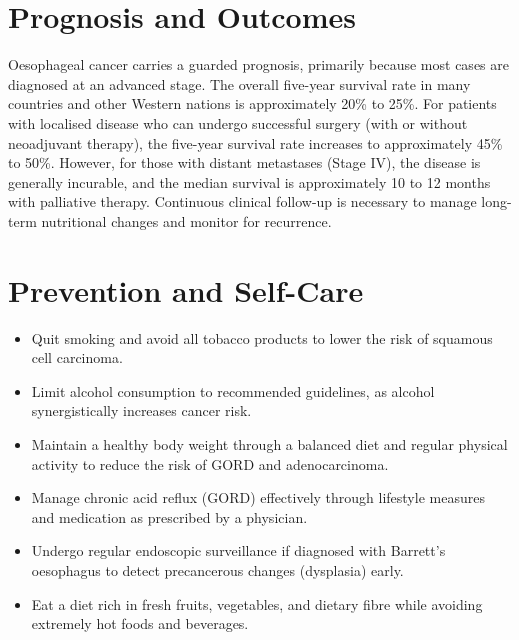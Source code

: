 \section*{Prognosis and Outcomes}
Oesophageal cancer carries a guarded prognosis, primarily because most cases are diagnosed at an advanced stage. The overall five-year survival rate in many countries and other Western nations is approximately 20\% to 25\%. For patients with localised disease who can undergo successful surgery (with or without neoadjuvant therapy), the five-year survival rate increases to approximately 45\% to 50\%. However, for those with distant metastases (Stage IV), the disease is generally incurable, and the median survival is approximately 10 to 12 months with palliative therapy. Continuous clinical follow-up is necessary to manage long-term nutritional changes and monitor for recurrence.

\section*{Prevention and Self-Care}
\begin{itemize}
    \item Quit smoking and avoid all tobacco products to lower the risk of squamous cell carcinoma.
    \item Limit alcohol consumption to recommended guidelines, as alcohol synergistically increases cancer risk.
    \item Maintain a healthy body weight through a balanced diet and regular physical activity to reduce the risk of GORD and adenocarcinoma.
    \item Manage chronic acid reflux (GORD) effectively through lifestyle measures and medication as prescribed by a physician.
    \item Undergo regular endoscopic surveillance if diagnosed with Barrett's oesophagus to detect precancerous changes (dysplasia) early.
    \item Eat a diet rich in fresh fruits, vegetables, and dietary fibre while avoiding extremely hot foods and beverages.
\end{itemize}

